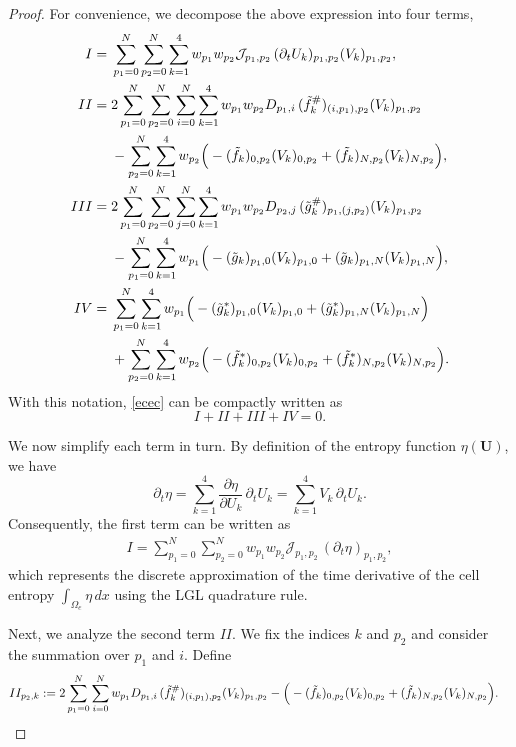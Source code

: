 \documentclass[fleqn,11pt]{amsart}
\begin{document}
{\begin{proof}
For convenience, we decompose the above expression into four terms,
\begin{align*}
I = &\; \sum_{p_1=0}^N\sum_{p_2=0}^N\sum_{k=1}^4 w_{p_1}w_{p_2}\mathcal{J}_{p_1,p_2}\,(\partial_tU_k)_{p_1,p_2}(V_k)_{p_1,p_2},\\
II = &\; 
2\sum_{p_1=0}^N\sum_{p_2=0}^N\sum_{i=0}^N\sum_{k=1}^4w_{p_1}w_{p_2} D_{p_1,i}\,(\tilde{f}_k^{\#})_{(i,p_1),p_2}(V_k)_{p_1,p_2}\\
&\;-\sum_{p_2=0}^N\sum_{k=1}^4
w_{p_2}\Big(
-(\Tilde{f}_k)_{0,p_2}(V_k)_{0,p_2}
+(\Tilde{f}_k)_{N,p_2}(V_k)_{N,p_2}\Big),\\
III = &\; 
2\sum_{p_1=0}^N\sum_{p_2=0}^N\sum_{j=0}^N\sum_{k=1}^4w_{p_1}w_{p_2} D_{p_2,j}\,(\tilde{g}_k^{\#})_{p_1,(j,p_2)}(V_k)_{p_1,p_2}\\
&\;
-\sum_{p_1=0}^N\sum_{k=1}^4 w_{p_1}\Big(
-(\Tilde{g}_k)_{p_1,0}(V_k)_{p_1,0}
+(\Tilde{g}_k)_{p_1,N}(V_k)_{p_1,N}\Big),\\
IV = &\;
\sum_{p_1=0}^N\sum_{k=1}^4 w_{p_1}\Big(
-(\Tilde{g}_k^*)_{p_1,0}(V_k)_{p_1,0}
+(\Tilde{g}_k^*)_{p_1,N}(V_k)_{p_1,N}\Big)\\
&\;+\sum_{p_2=0}^N\sum_{k=1}^4
w_{p_2}\Big(
-(\Tilde{f}_k^*)_{0,p_2}(V_k)_{0,p_2}
+(\Tilde{f}_k^*)_{N,p_2}(V_k)_{N,p_2}\Big).
\end{align*}
With this notation, \eqref{ecec} can be compactly written as
\[
I + II + III + IV = 0.
\]

We now simplify each term in turn.
By definition of the entropy function $\eta(\bm U)$, we have
\[
\partial_t \eta
=
\sum_{k=1}^4 \frac{\partial \eta}{\partial U_k}\,\partial_t U_k
=
\sum_{k=1}^4 V_k\,\partial_t U_k.
\]
Consequently, the first term can be written as
\begin{align}
\label{cell-e}
I =
\sum_{p_1=0}^N\sum_{p_2=0}^N
w_{p_1}w_{p_2}\mathcal{J}_{p_1,p_2}\,
(\partial_t\eta)_{p_1,p_2},
\end{align}
which represents the discrete approximation of the time derivative of the
cell entropy $\int_{\Omega_e} \eta \, dx$ using the LGL quadrature rule.

Next, we analyze the second term $II$.
We fix the indices $k$ and $p_2$ and consider the summation over $p_1$ and $i$.
Define
\begin{align*}
II_{p_2,k}:= &\;
2\sum_{p_1=0}^N\sum_{i=0}^N w_{p_1}D_{p_1,i}\,
(\tilde{f}_k^{\#})_{(i,p_1),p_2}(V_k)_{p_1,p_2}
-\Big(
-(\Tilde{f}_k)_{0,p_2}(V_k)_{0,p_2}
+(\Tilde{f}_k)_{N,p_2}(V_k)_{N,p_2}
\Big).
\end{align*}


\end{proof}}
\end{document}

